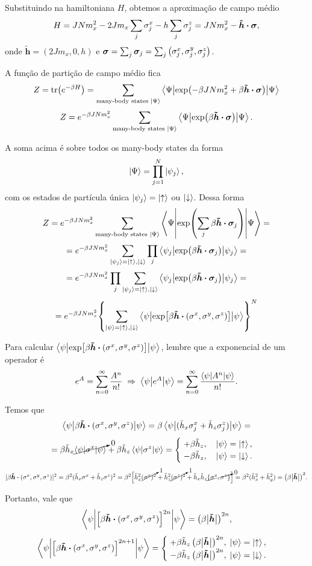 \documentclass[a4paper,10pt]{article}
\newcommand{\hh}{\tilde{h}}
\newcommand{\hhh}{\bm{\tilde{h}}}
\newcommand{\vecs}{(\s^x, \s^y, \s^z)}
\renewcommand{\ss}{\bm{\sigma}}
\begin{document}
\n

Substituindo na hamiltoniana $H$, obtemos a aproximação de campo médio
$$
H = J N m_x^2 - 2Jm_x \sum_{j} \s_j^x - h \sum_{j} \s_j^z = J N m_x^2 - \hhh \vdot \ss,
$$
onde $\hhh = (2J m_x, 0, h)$ e $\ss = \sum_{j} \ss_j = \sum_{j} \qty(\s_j^x, \s_j^y, \s_j^z)$.

\n

A função de partição de campo médio fica
$$
Z = \tr(e^{-\beta H}) = \sum_{\text{many-body states } \ket{\Psi}} \ev**{\exp(-\beta J N m_x^2 + \beta \hhh \vdot \ss)}{\Psi}
$$
$$
Z =
e^{-\beta J N m_x^2} \sum_{\text{many-body states } \ket{\Psi}} \ev**{\exp(\beta \hhh \vdot \ss)}{\Psi}.
$$

A soma acima é sobre todos os many-body states da forma
$$
\ket{\Psi} = \prod_{j=1}^N \ket{\psi_j},
$$
com os estados de partícula única $\ket{\psi_j} = \ket{\uparrow}$ ou $\ket{\downarrow}$. Dessa forma
$$
Z =
e^{-\beta J N m_x^2} \sum_{\text{many-body states } \ket{\Psi}} \ev**{\exp(\sum_{j} \beta \hhh \vdot \ss_j)}{\Psi} =
$$
$$
= e^{-\beta J N m_x^2} \sum_{\ket{\psi_j} = \ket{\up},\ket{\down}} \prod_j \ev**{\exp(\beta \hhh \vdot \ss_j)}{\psi_j} =
$$
$$
= e^{-\beta J N m_x^2} \prod_j \sum_{\ket{\psi_j} = \ket{\up},\ket{\down}} \ev**{\exp(\beta \hhh \vdot \ss_j)}{\psi_j} =
$$
$$
= e^{-\beta J N m_x^2} \qty{\sum_{\ket{\psi} = \ket{\up},\ket{\down}} \ev**{\exp[\beta \hhh \vdot (\s^x, \s^y, \s^z)]}{\psi}}^N
$$

Para calcular  $\ev**{\exp[\beta \hhh \vdot (\s^x, \s^y, \s^z)]}{\psi}$, lembre que a exponencial de um operador é
$$
e^A = \sum_{n=0}^{\infty} \frac{A^n}{n!} \implies
\ev**{e^A}{\psi} = \sum_{n=0}^{\infty} \frac{\ev**{A^n}{\psi}}{n!}.
$$

\n

Temos que
$$
\ev**{\beta \hhh \vdot \vecs}{\psi} =
\beta \ev**{(\hh_x \s_j^x + \hh_z \s_j^z)}{\psi} =
$$
$$
=
\beta \hh_x \cancelto{0}{\ev**{\s^x}{\psi}} +
\beta \hh_z \ev**{\s^z}{\psi} =
\begin{cases}
\; +\beta \hh_z, \quad \ket{\psi} = \ket{\up}, \\
\; -\beta \hh_z, \quad \ket{\psi} = \ket{\down}.
\end{cases}
$$
$$
[\beta \hhh \vdot \vecs]^2 = \beta^2 (\hh_x \s^x + \hh_z \s^z)^2 =
\beta^2 \Big[\hh_x^2 \cancelto{1}{(\s^{x})^2} + \hh_z^2 \cancelto{1}{(\s^{z})^2}
+ \hh_x \hh_z \cancelto{0}{\{\s^x, \s^z\}}\Big] =
\beta^2 (\hh_x^2 + \hh_y^2) = \qty(\beta \abs{\hhh})^2.
$$

Portanto, vale que
$$
\ev**{\Big[\beta \hhh \vdot \vecs\Big]^{2n}}{\psi} = \qty(\beta \abs{\hhh})^{2n},
$$
$$
\ev**{\Big[\beta \hhh \vdot \vecs\Big]^{2n+1}}{\psi} =
\begin{cases}
\; +\beta \hh_z \, \qty(\beta \abs{\hhh})^{2n}, \; \ket{\psi} = \ket{\up}, \\
\; -\beta \hh_z \, \qty(\beta \abs{\hhh})^{2n}, \; \ket{\psi} = \ket{\down}.
\end{cases}
$$
\end{document}
